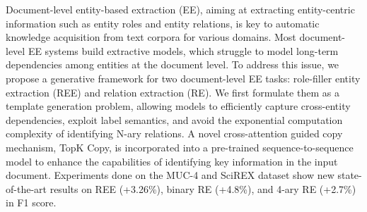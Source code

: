 Document-level entity-based extraction (EE), aiming at extracting entity-centric information such as entity roles and entity relations, is key to automatic knowledge acquisition from text corpora for various domains. Most document-level EE systems build extractive models, which struggle to model long-term dependencies among entities at the document level. To address this issue, we propose a generative framework for two document-level EE tasks: role-filler entity extraction (REE) and relation extraction (RE). We first formulate them as a template generation problem, allowing models to efficiently capture cross-entity dependencies, exploit label semantics, and avoid the exponential computation complexity of identifying N-ary relations. A novel cross-attention guided copy mechanism, TopK Copy, is incorporated into a pre-trained sequence-to-sequence model to enhance the capabilities of identifying key information in the input document. Experiments done on the MUC-4 and SciREX dataset show new state-of-the-art results on REE (+3.26\%), binary RE (+4.8\%), and 4-ary RE (+2.7\%) in F1 score.
